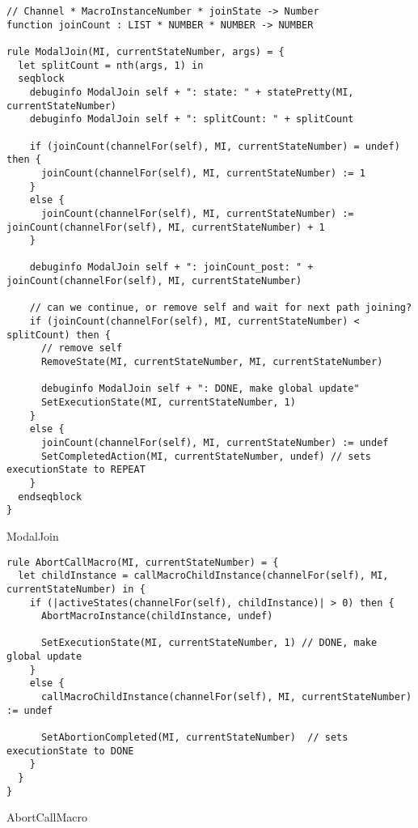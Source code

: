 \begin{listing}[H]
\begin{verbatim}
// Channel * MacroInstanceNumber * joinState -> Number
function joinCount : LIST * NUMBER * NUMBER -> NUMBER

rule ModalJoin(MI, currentStateNumber, args) = {
  let splitCount = nth(args, 1) in
  seqblock
    debuginfo ModalJoin self + ": state: " + statePretty(MI, currentStateNumber)
    debuginfo ModalJoin self + ": splitCount: " + splitCount

    if (joinCount(channelFor(self), MI, currentStateNumber) = undef) then {
      joinCount(channelFor(self), MI, currentStateNumber) := 1
    }
    else {
      joinCount(channelFor(self), MI, currentStateNumber) := joinCount(channelFor(self), MI, currentStateNumber) + 1
    }

    debuginfo ModalJoin self + ": joinCount_post: " + joinCount(channelFor(self), MI, currentStateNumber)

    // can we continue, or remove self and wait for next path joining?
    if (joinCount(channelFor(self), MI, currentStateNumber) < splitCount) then {
      // remove self
      RemoveState(MI, currentStateNumber, MI, currentStateNumber)

      debuginfo ModalJoin self + ": DONE, make global update"
      SetExecutionState(MI, currentStateNumber, 1)
    }
    else {
      joinCount(channelFor(self), MI, currentStateNumber) := undef
      SetCompletedAction(MI, currentStateNumber, undef) // sets executionState to REPEAT
    }
  endseqblock
}
\end{verbatim}
\caption{ModalJoin}
\label{lst:asm:ModalJoin}
\end{listing}




\begin{listing}[H]
\begin{verbatim}
rule AbortCallMacro(MI, currentStateNumber) = {
  let childInstance = callMacroChildInstance(channelFor(self), MI, currentStateNumber) in {
    if (|activeStates(channelFor(self), childInstance)| > 0) then {
      AbortMacroInstance(childInstance, undef)

      SetExecutionState(MI, currentStateNumber, 1) // DONE, make global update
    }
    else {
      callMacroChildInstance(channelFor(self), MI, currentStateNumber) := undef

      SetAbortionCompleted(MI, currentStateNumber)  // sets executionState to DONE
    }
  }
}
\end{verbatim}
\caption{AbortCallMacro}
\label{lst:asm:AbortCallMacro}
\end{listing}




